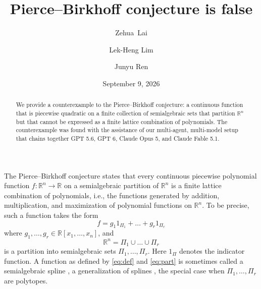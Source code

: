 \documentclass[11pt]{amsart}
\theoremstyle{remark}
\begin{document}
\title{Pierce--Birkhoff conjecture is false}
\author[Z.~Lai]{Zehua~Lai}
\address{Institute of Applied Mathematics, Academy of Mathematics and Systems Science, Chinese Academy of Sciences, Beijing 100190, China}
\author[L.-H.~Lim]{Lek-Heng Lim}
\author[J.~Ren]{Junyu Ren}
\address{Computational and Applied Mathematics Initiative, University of Chicago, Chicago, IL 60637}
\date{September 9, 2026}

\begin{abstract}
We provide a counterexample to the Pierce--Birkhoff conjecture: a continuous function that is piecewise quadratic on a finite collection of semialgebraic sets that partition $\mathbb{R}^n$ but that cannot be expressed as a finite lattice combination of polynomials. 
The counterexample was found with the assistance of our multi-agent, multi-model setup that chains together GPT 5.6, GPT 6, Claude Opus 5, and Claude Fable 5.1.
\end{abstract}

\maketitle


The Pierce--Birkhoff conjecture states that every continuous piecewise polynomial function $f : \mathbb{R}^n \to \mathbb{R}$ on a semialgebraic partition of $\mathbb{R}^n$ is a finite lattice combination of polynomials, i.e., the functions generated by addition, multiplication, and maximization of polynomial functions on $\mathbb{R}^n$. To be precise, such a function takes the form
\begin{equation}\label{eq:def}
f = g_1 1_{\Pi_1} + \dots +  g_r 1_{\Pi_r}
\end{equation}
where $g_1,\dots,g_r \in \mathbb{R}[x_1,\dots,x_n]$, and
\begin{equation}\label{eq:part}
\mathbb{R}^n = \Pi_1 \cup \dots \cup \Pi_r
\end{equation}
is a partition into semialgebraic sets $\Pi_1,\dots,\Pi_r$. Here $1_{\Pi}$ denotes the indicator function. A function as defined by \eqref{eq:def} and \eqref{eq:part} is sometimes called a semialgebraic spline \cite{dipasquale2017}, a generalization of splines \cite{Chui}, the special case when $\Pi_1,\dots,\Pi_r$ are polytopes.
\end{document}
